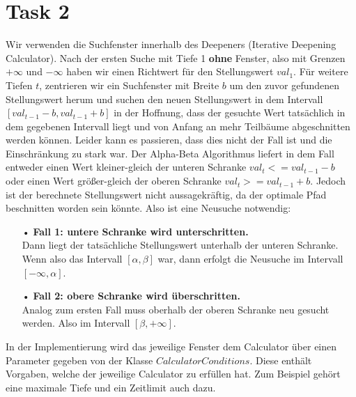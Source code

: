\section{Task 2}
Wir verwenden die Suchfenster innerhalb des Deepeners (Iterative Deepening Calculator).
Nach der ersten Suche mit Tiefe 1 \textbf{ohne} Fenster, also mit Grenzen $+\infty$ und $-\infty$ haben wir einen Richtwert für den Stellungswert $val_1$. Für weitere Tiefen $t$, zentrieren wir ein Suchfenster mit Breite $b$ um den zuvor gefundenen Stellungswert herum und suchen den neuen Stellungswert in dem Intervall $[val_{t-1} - b, val_{t-1} + b]$ in der Hoffnung, dass der gesuchte Wert tatsächlich in dem gegebenen Intervall liegt und von Anfang an mehr Teilbäume abgeschnitten werden können. Leider kann es passieren, dass dies nicht der Fall ist und die Einschränkung zu stark war. Der Alpha-Beta Algorithmus liefert in dem Fall entweder einen Wert kleiner-gleich der unteren Schranke $val_t <= val_{t-1} - b$ oder einen Wert größer-gleich der oberen Schranke $val_t >= val_{t-1} + b$. Jedoch ist der berechnete Stellungswert nicht aussagekräftig, da der optimale Pfad beschnitten worden sein könnte. Also ist eine Neusuche notwendig:
\begin{enumerate}
\item[•] \textbf{Fall 1: untere Schranke wird unterschritten.}\\
Dann liegt der tatsächliche Stellungswert unterhalb der unteren Schranke. Wenn also das Intervall $[\alpha,\beta]$ war, dann erfolgt die Neusuche im Intervall $[-\infty, \alpha]$.
\item[•] \textbf{Fall 2: obere Schranke wird überschritten.}\\
Analog zum ersten Fall muss oberhalb der oberen Schranke neu gesucht werden. Also im Intervall $[\beta, +\infty]$.
\end{enumerate}
In der Implementierung wird das jeweilige Fenster dem Calculator über einen Parameter gegeben von der Klasse $CalculatorConditions$. Diese enthält Vorgaben, welche der jeweilige Calculator zu erfüllen hat. Zum Beispiel gehört eine maximale Tiefe und ein Zeitlimit auch dazu.
